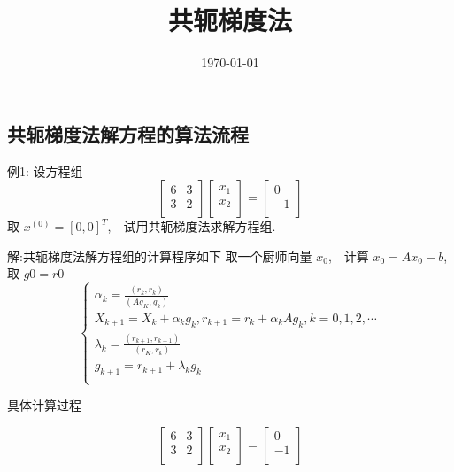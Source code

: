 \documentclass{article}
\begin{document}
\title{共轭梯度法}
\author{}
\date{\today}
\maketitle
\subsection{共轭梯度法解方程的算法流程}

例1: 设方程组
\begin{equation}\label{eq:AB}
\begin{bmatrix}
6 & 3\\
3 & 2\\
\end{bmatrix}
\begin{bmatrix}
x_1\\
x_2\\
\end{bmatrix}
=\begin{bmatrix}
0\\
-1\\
\end{bmatrix}
\end{equation}
取 $x^{(0)}=[0,0]^T$,　试用共轭梯度法求解方程组.

解:共轭梯度法解方程组的计算程序如下
取一个厨师向量 $x_0$,　计算 $x_0=Ax_0-b$, 取 $g0=r0$
\begin{equation}\label{eq:AC}
\left\{
\begin{array}{l}
\alpha_k = \frac{(r_k,r_k)}{(Ag_K,g_k)}\\
X_{k+1} = X_k+\alpha_k g_k,r_{k+1}=r_k+\alpha_kAg_k,k=0,1,2,\cdots\\
\lambda_k=\frac{(r_{k+1},r_{k+1})}{(r_K,r_k)}\\
g_{k+1}=r_{k+1}+\lambda_kg_k\\
\end{array}\right.
\end{equation}

具体计算过程

\begin{equation}
\begin{bmatrix}
6 & 3\\
3 & 2\\
\end{bmatrix}
\begin{bmatrix}
x_1\\
x_2\\
\end{bmatrix}
=\begin{bmatrix}
0\\
-1\\
\end{bmatrix}
\end{equation}
\end{document}
